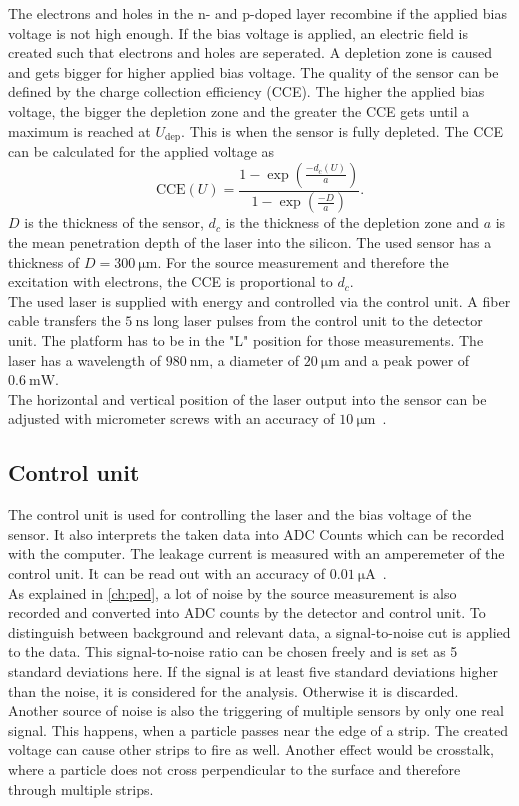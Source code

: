 The electrons and holes in the n- and p-doped layer recombine if the applied bias voltage is not high enough. If the
bias voltage is applied, an electric field is created such that electrons and holes are seperated. A depletion zone
is caused and gets bigger for higher applied bias voltage. The quality of the sensor can be defined by the charge
collection efficiency (CCE). The higher the applied bias voltage, the bigger the depletion zone and the greater
the CCE gets until a maximum is reached at $U_{\mathrm{dep}}$. This is when the sensor is fully depleted. The CCE can be 
calculated for the applied voltage as
\begin{equation}
    \text{CCE}(U) = \frac{1-\exp{(\frac{-d_c(U)}{a})}}{1-\exp{(\frac{-D}{a})}}.
    \label{eq:CCE}
\end{equation}
$D$ is the thickness of the sensor, $d_c$ is the thickness of the depletion zone and $a$ is the mean penetration depth of
the laser into the silicon. The used sensor has a thickness of $D = \qty{300}{\micro\metre}$. For the source measurement and
therefore the excitation with electrons, the CCE is proportional to $d_c$.\\
The used laser is supplied with energy and controlled via the control unit. A fiber cable transfers the $\qty{5}{\nano\second}$ long laser pulses from
the control unit to the detector unit. The platform has to be in the "L" position for those measurements. The laser has a 
wavelength of $\qty{980}{\nano\metre}$, a diameter of $\qty{20}{\micro\metre}$ and a peak power of $\qty{0.6}{\milli\watt}$.\\
The horizontal and vertical position of the laser output into the sensor can be adjusted with micrometer screws with an accuracy
of $\qty{10}{\micro\metre}$~\cite{SiliconStrip}.

\subsection{Control unit}

The control unit is used for controlling the laser and the bias voltage of the sensor. It also interprets the taken
data into ADC Counts which can be recorded with the computer. The leakage current is measured with an amperemeter of
the control unit. It can be read out with an accuracy of $\qty{0.01}{\micro\ampere}$~\cite{SiliconStrip}.\\
As explained in \autoref{ch:ped}, a lot of noise by the source measurement is also recorded and converted into ADC counts by the detector and control unit.
To distinguish between background and relevant data, a signal-to-noise cut is applied to the data. This signal-to-noise ratio 
can be chosen freely and is set as 5 standard deviations here. If the signal is at least five standard deviations higher than the noise, it is considered for the analysis.
Otherwise it is discarded.\\
Another source of noise is also the triggering of multiple sensors by only one real signal. This happens, when
a particle passes near the edge of a strip. The created voltage can cause other strips to fire as well. Another effect
would be crosstalk, where a particle does not cross perpendicular to the surface and therefore through multiple strips.

